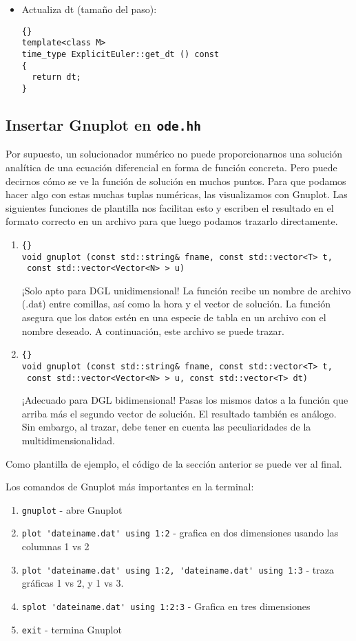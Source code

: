\begin{itemize}
\item Actualiza dt (tamaño del paso):
{\footnotesize{\begin{lstlisting}{}
template<class M>
time_type ExplicitEuler::get_dt () const
{
  return dt;
}
\end{lstlisting}}}
\end{itemize}

\subsection{Insertar Gnuplot en \lstinline{ode.hh}}
Por supuesto, un solucionador numérico no puede proporcionarnos una solución analítica de una ecuación diferencial en forma de función concreta. Pero puede decirnos cómo se ve la función de solución en muchos puntos. Para que podamos hacer algo con estas muchas tuplas numéricas, las visualizamos con Gnuplot. Las siguientes funciones de plantilla nos facilitan esto y escriben el resultado en el formato correcto en un archivo para que luego podamos trazarlo directamente.

\begin{enumerate}
\item
{\footnotesize{\begin{lstlisting}{}
void gnuplot (const std::string& fname, const std::vector<T> t,
 const std::vector<Vector<N> > u)
\end{lstlisting}}}

¡Solo apto para DGL unidimensional! La función recibe un nombre de archivo (.dat) entre comillas, así como la hora y el vector de solución. La función asegura que los datos estén en una especie de tabla en un archivo con el nombre deseado. A continuación, este archivo se puede trazar.
\item
{\footnotesize{\begin{lstlisting}{}
void gnuplot (const std::string& fname, const std::vector<T> t,
 const std::vector<Vector<N> > u, const std::vector<T> dt)
\end{lstlisting}}}

¡Adecuado para DGL bidimensional! Pasas los mismos datos a la función que arriba más el segundo vector de solución. El resultado también es análogo. Sin embargo, al trazar, debe tener en cuenta las peculiaridades de la multidimensionalidad.
\end{enumerate}

Como plantilla de ejemplo, el código de la sección anterior se puede ver al final.

Los comandos de Gnuplot más importantes en la terminal:
\begin{enumerate}
\item \lstinline{gnuplot} - abre Gnuplot
\item \lstinline{plot 'dateiname.dat' using 1:2} - grafica en dos dimensiones usando las columnas 1 vs 2 
\item \lstinline{plot 'dateiname.dat' using 1:2, 'dateiname.dat' using 1:3} - traza gráficas 1 vs 2, y 1 vs 3.
\item \lstinline{splot 'dateiname.dat' using 1:2:3} - Grafica en tres dimensiones
\item \lstinline{exit} - termina Gnuplot
\end{enumerate}


